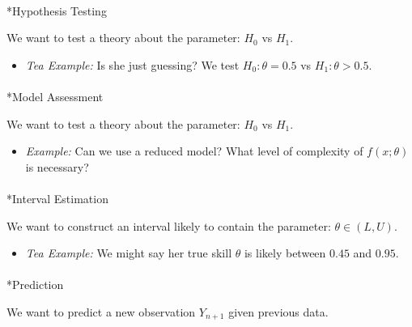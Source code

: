\documentclass[
  letterpaper,
  DIV=11,
  numbers=noendperiod]{scrreprt}
\makeatletter
\let\oldparagraph\paragraph
\renewcommand{\paragraph}{
    \@ifstar
      \xxxParagraphStar
      \xxxParagraphNoStar
  }
\newcommand{\xxxParagraphStar}[1]{\oldparagraph*{#1}\mbox{}}
\newcommand{\xxxParagraphNoStar}[1]{\oldparagraph{#1}\mbox{}}
\providecommand{\tightlist}{%
  \setlength{\itemsep}{0pt}\setlength{\parskip}{0pt}}
\renewcommand{\[}{\begin{equation}}
\renewcommand{\]}{\end{equation}}
\theoremstyle{definition}
\theoremstyle{plain}
\theoremstyle{plain}
\theoremstyle{plain}
\theoremstyle{definition}
\theoremstyle{plain}
\theoremstyle{remark}
\makeatother
\begin{document}
\paragraph*{Hypothesis Testing}\label{hypothesis-testing}

We want to test a theory about the parameter: \(H_0\) vs \(H_1\).

\begin{itemize}
\tightlist
\item
  \emph{Tea Example:} Is she just guessing? We test
  \(H_0: \theta = 0.5\) vs \(H_1: \theta > 0.5\).
\end{itemize}

\paragraph*{Model Assessment}\label{model-assessment}

We want to test a theory about the parameter: \(H_0\) vs \(H_1\).

\begin{itemize}
\tightlist
\item
  \emph{Example:} Can we use a reduced model? What level of complexity
  of \(f(x; \theta)\) is necessary?
\end{itemize}

\paragraph*{Interval Estimation}\label{interval-estimation}

We want to construct an interval likely to contain the parameter:
\(\theta \in (L, U)\).

\begin{itemize}
\tightlist
\item
  \emph{Tea Example:} We might say her true skill \(\theta\) is likely
  between \(0.45\) and \(0.95\).
\end{itemize}

\paragraph*{Prediction}\label{prediction}

We want to predict a new observation \(Y_{n+1}\) given previous data.
\end{document}
